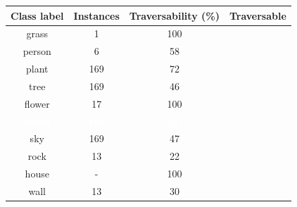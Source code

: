 \documentclass[12pt,a4paper,table,dvipsnames,tikz]{report}
\newcommand{\white}[1]{\textbf{\textcolor{white}{#1}}} %
\begin{document}
\begin{table}[h!]
\begin{subtable}[h!]{\textwidth}
\begin{tabular}{|c|c|c|c|}
				\hline
				Class label & Instances & Traversability (\%) & Traversable\\
				\hline\hline
				grass & 1 & 100 & \checkmark\\
				\hline
				person & 6 & 58 & \checkmark\\
				\hline
				plant & 169 & 72 & \checkmark\\
				\hline
				\rowcolor{tree}
				tree & 169 & 46 &\\
				\hline
				flower & 17 & 100 & \checkmark\\
				\hline
				\rowcolor{earth}
				\white{earth} & \white{169} & \white{46} &\\
				\hline
				\rowcolor{sky}
				sky & 169 & 47 &\\
				\hline
				rock & 13 & 22 &\\
				\hline
				\rowcolor{house}
				house & - & 100 & \checkmark\\
				\hline
				wall & 13 & 30 &\\
				\hline
			\end{tabular}
			\label{table:trav.f2}
		\end{subtable}
		\label{table:trav.folds}
	\end{table}
	
\end{document}
